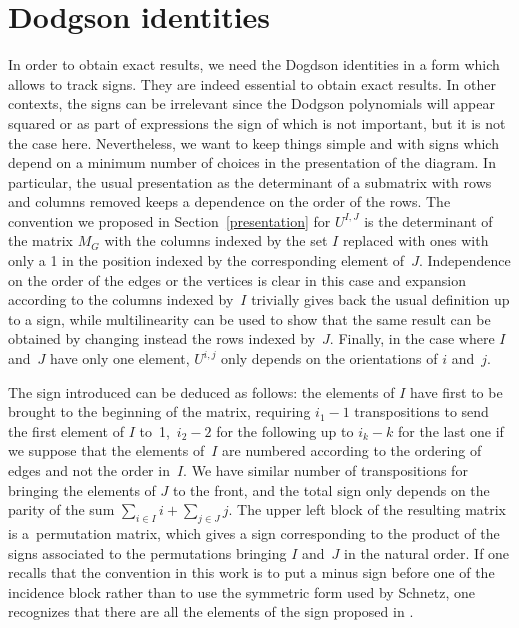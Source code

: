 \section{Dodgson identities}\label{polyn}

In order to obtain exact results, we need the Dogdson identities in a form which allows to track signs.
They are indeed essential to obtain exact results. In other contexts, the signs can be irrelevant
since the Dodgson polynomials will appear squared or as part of expressions the sign of which is not important,
but it is not the case here. Nevertheless, we want to keep things simple and with
signs which depend on a minimum number of choices in the presentation of the diagram. In particular, the usual
presentation as the determinant of a submatrix with rows and columns removed keeps a dependence on the order
of the rows. The convention we proposed in Section~\ref{presentation} for $U^{I ,J}$ is the determinant of the matrix
$M_G$ with the columns indexed by the set $I$ replaced with ones with only a 1 in the position indexed by the corresponding
element of~$J$. Independence on the order of the edges or the vertices is clear in this case and expansion according to
the columns indexed by~$I$ trivially gives back the usual definition up to a sign, while multilinearity can be used to
show that the same result can be obtained by changing instead the rows indexed by~$J$. Finally, in the case where $I$
and~$J$ have only one element, $U^{i,j}$ only depends on the orientations of $i$ and~$j$.

The sign introduced can be deduced as follows: the elements of $I$ have first to be brought to the beginning of the matrix,
requiring $i_1 - 1$ transpositions to send the first element of $I$ to~1,~${i_2 -2}$ for the following up to $i_k -k $
for the last one if we suppose that the elements of~$I$ are numbered according to the ordering of edges and not the order in~$I$.
We have similar number of transpositions for bringing the elements of $J$ to the front, and the total sign only depends on the parity
of the sum $\sum_{i\in I} i+ \sum_{j\in J} j$. The upper left block of the resulting matrix is a~permutation matrix, which gives a sign
corresponding to the product of the signs associated to the permutations bringing $I$ and~$J$ in the natural order. If one recalls that
the convention in this work is to put a minus sign before one of the incidence block rather than to use the symmetric form used by Schnetz,
one recognizes that there are all the elements of the sign proposed in \cite[equation~(8)]{SC2021}.

